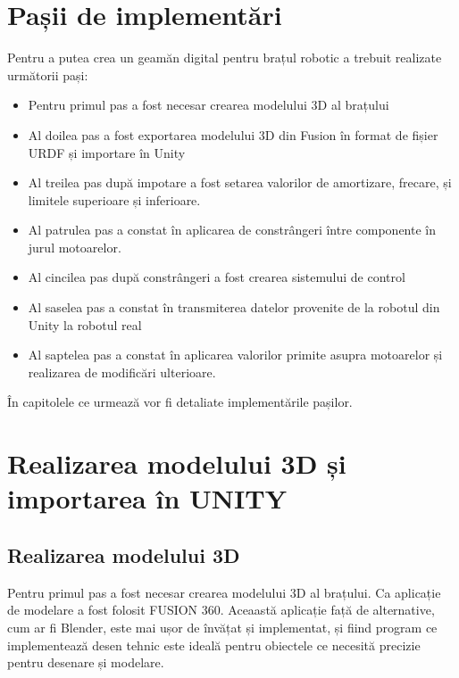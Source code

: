 \setcounter{page}{13}


\section{Pașii de implementări}
Pentru a putea crea un geamăn digital pentru brațul robotic a trebuit realizate următorii pași:

\begin{itemize}
	\item Pentru primul pas a fost necesar crearea modelului 3D al brațului
	\item Al doilea pas a fost exportarea modelului 3D din Fusion în format de fișier URDF și importare în Unity
	\item Al treilea pas după impotare a fost setarea valorilor de amortizare, frecare, și limitele superioare și inferioare.
	\item Al patrulea pas a constat în aplicarea de constrângeri între componente în jurul motoarelor.
	\item Al cincilea pas după constrângeri a fost crearea sistemului de control
	\item Al saselea pas a constat în transmiterea datelor provenite de la robotul din Unity la robotul real
	\item Al saptelea pas a constat în aplicarea valorilor primite asupra motoarelor și realizarea de modificări ulterioare.
\end{itemize}





 







În capitolele ce urmează vor fi detaliate implementările pașilor.


\section{Realizarea modelului 3D și importarea în UNITY}

\subsection{Realizarea modelului 3D}
Pentru primul pas a fost necesar crearea modelului 	3D al brațului. Ca aplicație de modelare a fost folosit FUSION 360. Aceaastă aplicație față de alternative, cum ar fi Blender, este mai ușor de învățat și implementat, și fiind program ce implementează desen tehnic este ideală pentru obiectele ce necesită precizie pentru desenare și modelare.


